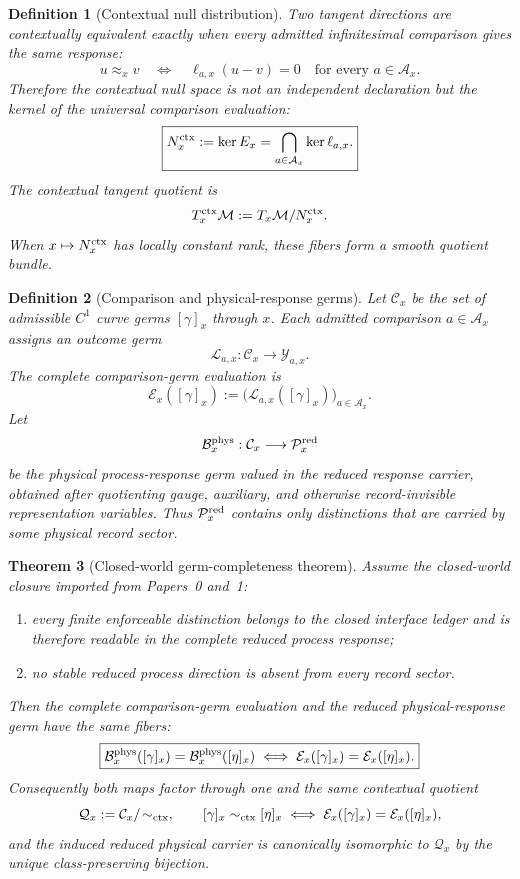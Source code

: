 \documentclass[11pt]{article}
\newtheorem{theorem}{Theorem}[section]
\newtheorem{definition}[theorem]{Definition}
\theoremstyle{remark}
\newcommand{\Mgeom}{\mathcal M}
\begin{document}
\begin{definition}[Contextual null distribution]
Two tangent directions are contextually equivalent exactly when every admitted
infinitesimal comparison gives the same response:
\[
        u\approx_x v
        \quad\Longleftrightarrow\quad
        \ell_{a,x}(u-v)=0
        \quad\text{for every }a\in\mathcal A_x.
\]
Therefore the contextual null space is not an independent declaration but the
kernel of the universal comparison evaluation:
\[
        \boxed{
        N_x^{\rm ctx}:=\ker E_x
        =\bigcap_{a\in\mathcal A_x}\ker\ell_{a,x}.}
\]
The contextual tangent quotient is
\[
        T_x^{\rm ctx}\Mgeom:=T_x\Mgeom/N_x^{\rm ctx}.
\]
When $x\mapsto N_x^{\rm ctx}$ has locally constant rank, these fibers form a
smooth quotient bundle.
\end{definition}


\begin{definition}[Comparison and physical-response germs]
\label{def:comparison-response-germs}
Let $\mathcal C_x$ be the set of admissible $C^1$ curve germs
$[\gamma]_x$ through $x$.  Each admitted comparison $a\in\mathcal A_x$ assigns
an outcome germ
\[
        \mathcal L_{a,x}:\mathcal C_x\longrightarrow\mathcal Y_{a,x}.
\]
The complete comparison-germ evaluation is
\[
        \mathcal E_x([\gamma]_x)
        :=\bigl(\mathcal L_{a,x}([\gamma]_x)\bigr)_{a\in\mathcal A_x}.
\]
Let
\[
        \mathcal B_x^{\rm phys}:\mathcal C_x\longrightarrow\mathcal P_x^{\rm red}
\]
be the physical process-response germ valued in the \emph{reduced} response
carrier, obtained after quotienting gauge, auxiliary, and otherwise
record-invisible representation variables.  Thus $\mathcal P_x^{\rm red}$
contains only distinctions that are carried by some physical record sector.
\end{definition}

\begin{theorem}[Closed-world germ-completeness theorem]
\label{thm:closed-world-germ-completeness}
Assume the closed-world closure imported from Papers~0 and~1:
\begin{enumerate}[label=(\roman*)]
\item every finite enforceable distinction belongs to the closed interface ledger
and is therefore readable in the complete reduced process response;
\item no stable reduced process direction is absent from every record sector.
\end{enumerate}
Then the complete comparison-germ evaluation and the reduced physical-response
germ have the same fibers:
\[
\boxed{
\mathcal B_x^{\rm phys}([\gamma]_x)
 =\mathcal B_x^{\rm phys}([\eta]_x)
\iff
\mathcal E_x([\gamma]_x)=\mathcal E_x([\eta]_x).}
\]
Consequently both maps factor through one and the same contextual quotient
\[
        \mathcal Q_x
        :=\mathcal C_x/\!\sim_{\rm ctx},
\qquad
[\gamma]_x\sim_{\rm ctx}[\eta]_x
\iff
\mathcal E_x([\gamma]_x)=\mathcal E_x([\eta]_x),
\]
and the induced reduced physical carrier is canonically isomorphic to
$\mathcal Q_x$ by the unique class-preserving bijection.
\end{theorem}
\end{document}
